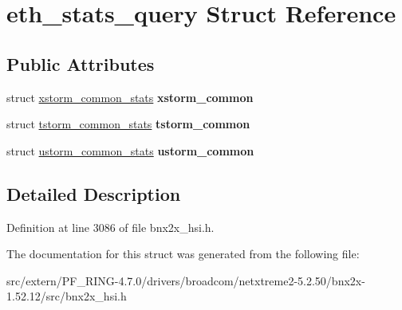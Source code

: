 \hypertarget{structeth__stats__query}{
\section{eth\_\-stats\_\-query Struct Reference}
\label{structeth__stats__query}
}
\subsection*{Public Attributes}
\begin{DoxyCompactItemize}
\item 
\hypertarget{structeth__stats__query_aef4c308c9e0fa283aceae87f85b2baf6}{
struct \hyperlink{structxstorm__common__stats}{xstorm\_\-common\_\-stats} {\bfseries xstorm\_\-common}}
\label{structeth__stats__query_aef4c308c9e0fa283aceae87f85b2baf6}

\item 
\hypertarget{structeth__stats__query_abde8232ff7db1359a84cde46e174444a}{
struct \hyperlink{structtstorm__common__stats}{tstorm\_\-common\_\-stats} {\bfseries tstorm\_\-common}}
\label{structeth__stats__query_abde8232ff7db1359a84cde46e174444a}

\item 
\hypertarget{structeth__stats__query_a4b165ad177a03ce3d89f3c90b9102665}{
struct \hyperlink{structustorm__common__stats}{ustorm\_\-common\_\-stats} {\bfseries ustorm\_\-common}}
\label{structeth__stats__query_a4b165ad177a03ce3d89f3c90b9102665}

\end{DoxyCompactItemize}


\subsection{Detailed Description}


Definition at line 3086 of file bnx2x\_\-hsi.h.



The documentation for this struct was generated from the following file:\begin{DoxyCompactItemize}
\item 
src/extern/PF\_\-RING-\/4.7.0/drivers/broadcom/netxtreme2-\/5.2.50/bnx2x-\/1.52.12/src/bnx2x\_\-hsi.h\end{DoxyCompactItemize}
